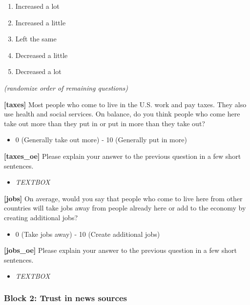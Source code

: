 \documentclass[
]{article}
\providecommand{\tightlist}{%
  \setlength{\itemsep}{0pt}\setlength{\parskip}{0pt}}
\begin{document}
\begin{enumerate}
\def\labelenumi{\arabic{enumi}.}
\tightlist
\item
  Increased a lot
\item
  Increased a little
\item
  Left the same
\item
  Decreased a little
\item
  Decreased a lot
\end{enumerate}

\emph{(randomize order of remaining questions)}

\textbf{{[}taxes{]}} Most people who come to live in the U.S. work and
pay taxes. They also use health and social services. On balance, do you
think people who come here take out more than they put in or put in more
than they take out?

\begin{itemize}
\tightlist
\item
  0 (Generally take out more) - 10 (Generally put in more)
\end{itemize}

\textbf{{[}taxes\_oe{]}} Please explain your answer to the previous
question in a few short sentences.

\begin{itemize}
\tightlist
\item
  \emph{TEXTBOX}
\end{itemize}

\textbf{{[}jobs{]}} On average, would you say that people who come to
live here from other countries will take jobs away from people already
here or add to the economy by creating additional jobs?

\begin{itemize}
\tightlist
\item
  0 (Take jobs away) - 10 (Create additional jobs)
\end{itemize}

\textbf{{[}jobs\_oe{]}} Please explain your answer to the previous
question in a few short sentences.

\begin{itemize}
\tightlist
\item
  \emph{TEXTBOX}
\end{itemize}

\hypertarget{block-2-trust-in-news-sources}{%
\subsubsection{Block 2: Trust in news
sources}\label{block-2-trust-in-news-sources}}
\end{document}
